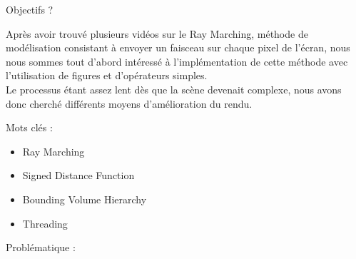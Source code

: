 \documentclass{article}
\begin{document}
Objectifs ? 

Après avoir trouvé plusieurs vidéos sur le Ray Marching, méthode de 
modélisation consistant à envoyer un faisceau sur chaque pixel de l'écran,
nous nous sommes tout d'abord intéressé à l'implémentation de cette méthode
avec l'utilisation de figures et d'opérateurs simples.\\
Le processus étant assez lent dès que la scène devenait complexe, nous avons donc
cherché différents moyens d'amélioration du rendu.
\smallskip 

Mots clés : 
\begin{itemize}
    \item Ray Marching
    \item Signed Distance Function 
    \item Bounding Volume Hierarchy 
    \item Threading
\end{itemize}
\smallskip

Problématique : 
\end{document}

